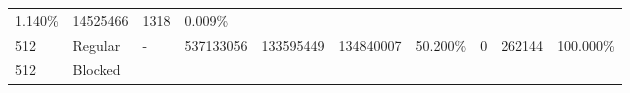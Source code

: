 \documentclass[11pt]{article}
\begin{document}
\begin{longtable}[]{@{}llllllllll@{}}
\begin{minipage}[t]{0.07\columnwidth}
1.140\%\strut
\end{minipage} & \begin{minipage}[t]{0.06\columnwidth}\raggedright\strut
14525466\strut
\end{minipage} & \begin{minipage}[t]{0.07\columnwidth}\raggedright\strut
1318\strut
\end{minipage} & \begin{minipage}[t]{0.07\columnwidth}\raggedright\strut
0.009\%\strut
\end{minipage}\tabularnewline
\begin{minipage}[t]{0.09\columnwidth}\raggedright\strut
512\strut
\end{minipage} & \begin{minipage}[t]{0.06\columnwidth}\raggedright\strut
Regular\strut
\end{minipage} & \begin{minipage}[t]{0.09\columnwidth}\raggedright\strut
-\strut
\end{minipage} & \begin{minipage}[t]{0.07\columnwidth}\raggedright\strut
537133056\strut
\end{minipage} & \begin{minipage}[t]{0.06\columnwidth}\raggedright\strut
133595449\strut
\end{minipage} & \begin{minipage}[t]{0.07\columnwidth}\raggedright\strut
134840007\strut
\end{minipage} & \begin{minipage}[t]{0.07\columnwidth}\raggedright\strut
50.200\%\strut
\end{minipage} & \begin{minipage}[t]{0.06\columnwidth}\raggedright\strut
0\strut
\end{minipage} & \begin{minipage}[t]{0.07\columnwidth}\raggedright\strut
262144\strut
\end{minipage} & \begin{minipage}[t]{0.07\columnwidth}\raggedright\strut
100.000\%\strut
\end{minipage}\tabularnewline
\begin{minipage}[t]{0.09\columnwidth}\raggedright\strut
512\strut
\end{minipage} & \begin{minipage}[t]{0.06\columnwidth}\raggedright\strut
Blocked\strut
\end{minipage} & \begin{minipage}[t]{0.09\columnwidth}\raggedright\strut

\end{minipage}
\end{longtable}
\end{document}
